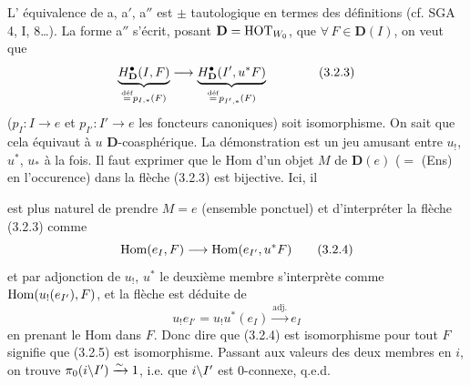 L' équivalence de a, a$'$, a$''$ est $\pm$ tautologique en termes des définitions (cf. SGA 4, I, 8\dots). La forme a$''$ s'écrit, posant $\mathbf{D} = \HOT_{W_0}$, que $\forall\, F \in \mathbf{D}(I)$, on veut que
\[
\underbrace{H^{\bullet}_{\mathbf{D}}(I,F)}_{\defeq p_{I,*}(F)} \longrightarrow \underbrace{H^{\bullet}_{\mathbf{D}}(I',u^*F)}_{\defeq p_{I',*}(F)} \qquad \tag*{(3.2.3)}
\]
($p_I : I \longrightarrow e$ et $p_{I'} : I' \longrightarrow e$ les foncteurs canoniques) soit isomorphisme. On sait que cela équivaut à $u$ $\mathbf{D}$-coasphérique. La démonstration est un jeu amusant entre $u_!$, $u^*$, $u_*$ à la fois. Il faut exprimer que le Hom d'un objet $M$ de $\mathbf{D}(e)$ ($=$ (Ens) en l'occurence) dans la flèche (3.2.3) est bijective. Ici, il %


est plus naturel de prendre $M = e$ (ensemble ponctuel) et d'interpréter la flèche (3.2.3) comme
\[
\Hom(e_I, F) \longrightarrow \Hom(e_{I'}, u^*F)
\tag*{(3.2.4)}
\]
et par adjonction de $u_!$, $u^*$ le deuxième membre s'interprète comme $\Hom(u_!(e_{I'}), F)$, et la flèche est déduite de
\[
u_!e_{I'} = u_!u^*(e_I) \xrightarrow{\text{adj.}} e_I
\tag*{(3.2.5)}
\]
en prenant le Hom dans $F$. Donc dire que (3.2.4) est isomorphisme pour tout $F$ signifie que (3.2.5) est isomorphisme. Passant aux valeurs des deux membres en $i$, on trouve $\pi_0(i\bs I') \xrightarrow{\sim} 1$, i.e. que $i\bs I'$ est 0-connexe, q.e.d.

